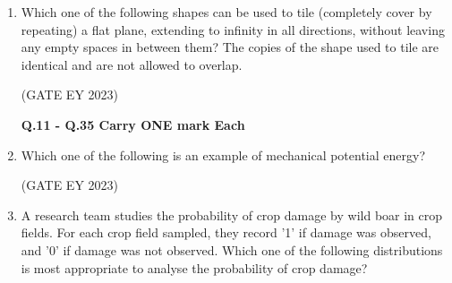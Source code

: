 \documentclass[journal,12pt,onecolumn]{IEEEtran}
\theoremstyle{remark}
\begin{document}
\begin{enumerate}
 \item  Which one of the following shapes can be used to tile (completely cover by
repeating) a flat plane, extending to infinity in all directions, without leaving any
empty spaces in between them? The copies of the shape used to tile are identical
and are not allowed to overlap.
\begin{enumerate}
\end{enumerate}

\hfill{(GATE EY 2023)}


\textbf{Q.11 - Q.35 Carry ONE mark Each}
 \item Which one of the following is an example of mechanical potential energy?
\begin{enumerate}
\end{enumerate}

\hfill{(GATE EY 2023)}

 \item A research team studies the probability of crop damage by wild boar in crop
fields. For each crop field sampled, they record '1' if damage was observed, and
'0' if damage was not observed. Which one of the following distributions is most
appropriate to analyse the probability of crop damage?

\begin{enumerate}
\end{enumerate}


\end{enumerate}
\end{document}
